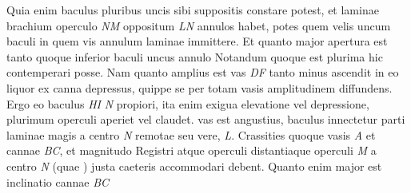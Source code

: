 Quia enim baculus pluribus uncis sibi suppositis constare potest, et laminae brachium operculo \textit{NM} oppositum \textit{LN} annulos habet, potes quem velis uncum baculi in quem vis annulum laminae immittere.
Et quanto major apertura est tanto quoque inferior baculi uncus annulo
\pend%
\newpage
\pstart%
Notandum quoque est plurima hic contemperari posse. 
Nam quanto amplius est vas \textit{DF} tanto minus ascendit in eo liquor ex canna depressus, quippe se per totam vasis amplitudinem diffundens.
Ergo eo 
baculus \textit{HI}
\textit{N} propiori, ita enim exigua elevatione vel depressione, plurimum operculi aperiet vel claudet.
vas est angustius, baculus innectetur parti laminae magis a centro \textit{N} remotae seu
vere, \textit{L}.
Crassities quoque vasis \textit{A} 
et 
cannae \textit{BC}, et magnitudo Registri
atque operculi
distantiaque operculi \textit{M} a centro \textit{N} (quae
%
) justa
caeteris accommodari debent.
Quanto enim major est inclinatio cannae \textit{BC}
